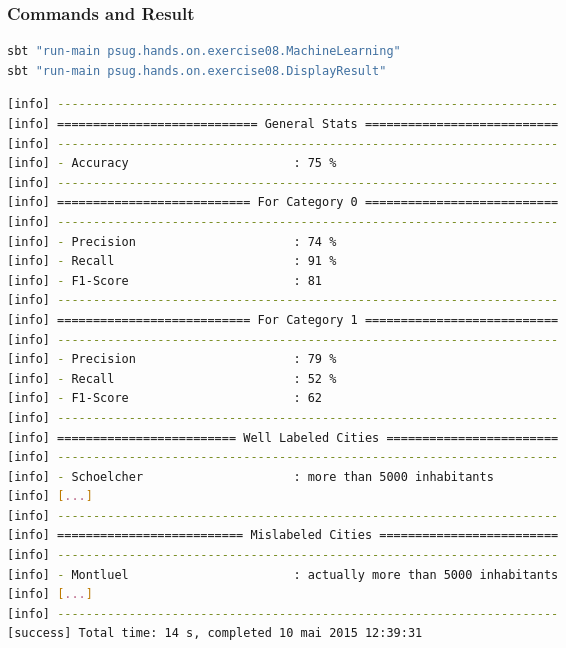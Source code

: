 \documentclass[slidetop,9pt,utf8]{beamer}
\begin{document}
\begin{CJK}{UTF8}{gbsn}
\begin{frame}
\end{frame}

\begin{frame}[fragile]

  \frametitle{Commands and Result}
     
    \begin{lstlisting}[language=bash, style=terminal-medium]
sbt "run-main psug.hands.on.exercise08.MachineLearning"
sbt "run-main psug.hands.on.exercise08.DisplayResult"    
    \end{lstlisting}

    \begin{lstlisting}[language=bash, style=terminal]
[info] ----------------------------------------------------------------------
[info] ============================ General Stats ===========================
[info] ----------------------------------------------------------------------
[info] - Accuracy                       : 75 %
[info] ----------------------------------------------------------------------
[info] =========================== For Category 0 ===========================
[info] ----------------------------------------------------------------------
[info] - Precision                      : 74 %
[info] - Recall                         : 91 %
[info] - F1-Score                       : 81
[info] ----------------------------------------------------------------------
[info] =========================== For Category 1 ===========================
[info] ----------------------------------------------------------------------
[info] - Precision                      : 79 %
[info] - Recall                         : 52 %
[info] - F1-Score                       : 62
[info] ----------------------------------------------------------------------
[info] ========================= Well Labeled Cities ========================
[info] ----------------------------------------------------------------------
[info] - Schoelcher                     : more than 5000 inhabitants
[info] [...]
[info] ----------------------------------------------------------------------
[info] ========================== Mislabeled Cities =========================
[info] ----------------------------------------------------------------------
[info] - Montluel                       : actually more than 5000 inhabitants
[info] [...]
[info] ----------------------------------------------------------------------
[success] Total time: 14 s, completed 10 mai 2015 12:39:31
    \end{lstlisting}


\end{frame}
\end{CJK}
\end{document}
